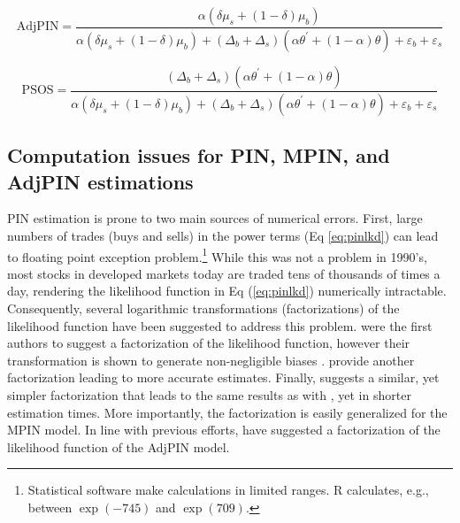 \begin{equation}
\label{eq:adjpinvalue}
\textrm{AdjPIN} =\frac{\alpha\left(\delta \mu_{s}+\left(1-\delta\right)\mu_{b}\right)}{\alpha\left(\delta \mu_{s}+\left(1-\delta\right)\mu_{b}\right)+\left(\Delta_{b}+\Delta_{s}\right)\left(\alpha \theta^{'}+\left(1-\alpha\right)\theta\right)+\varepsilon_{b}+\varepsilon_{s}}
\end{equation}

\begin{equation}
\label{eq:adjpinpsos}
\textrm{PSOS} =\frac{\left(\Delta_{b}+\Delta_{s}\right)\left(\alpha \theta^{'}+\left(1-\alpha\right)\theta\right)}{\alpha\left(\delta \mu_{s}+\left(1-\delta\right)\mu_{b}\right)+\left(\Delta_{b}+\Delta_{s}\right)\left(\alpha \theta^{'}+\left(1-\alpha\right)\theta\right)+\varepsilon_{b}+\varepsilon_{s}}
\end{equation}

\subsection{Computation issues for PIN, MPIN, and AdjPIN estimations}

PIN estimation is prone to two main sources of numerical errors. First, large numbers of trades (buys and sells) in the power terms (Eq \ref{eq:pinlkd}) can lead to floating point exception problem.\footnote{Statistical software make calculations in limited ranges. R calculates, e.g., between \(\exp(-745)\) and \(\exp(709).\)} While this was not a problem in 1990’s, most stocks in developed markets today are traded tens of thousands of
times a day, rendering the likelihood function in Eq (\ref{eq:pinlkd}) numerically intractable. Consequently, several logarithmic transformations (factorizations) of the likelihood function have been suggested to address this problem. \cite{Easley2008Time-varying} were the first authors to suggest a factorization of the likelihood function, however their transformation is shown to generate non-negligible biases \citep{Lin2011computing,Yan2012improved}. \cite{Lin2011computing} provide another factorization leading to  more accurate estimates. Finally,  \cite{ersan2016multilayer} suggests a similar, yet simpler factorization that leads to the same results as with \cite{Lin2011computing}, yet in shorter estimation times. More importantly, the \cite{ersan2016multilayer} factorization is easily generalized for the MPIN model. In line with previous efforts, \cite{Ersan2022methodological} have suggested a factorization of the likelihood function of the AdjPIN model.

